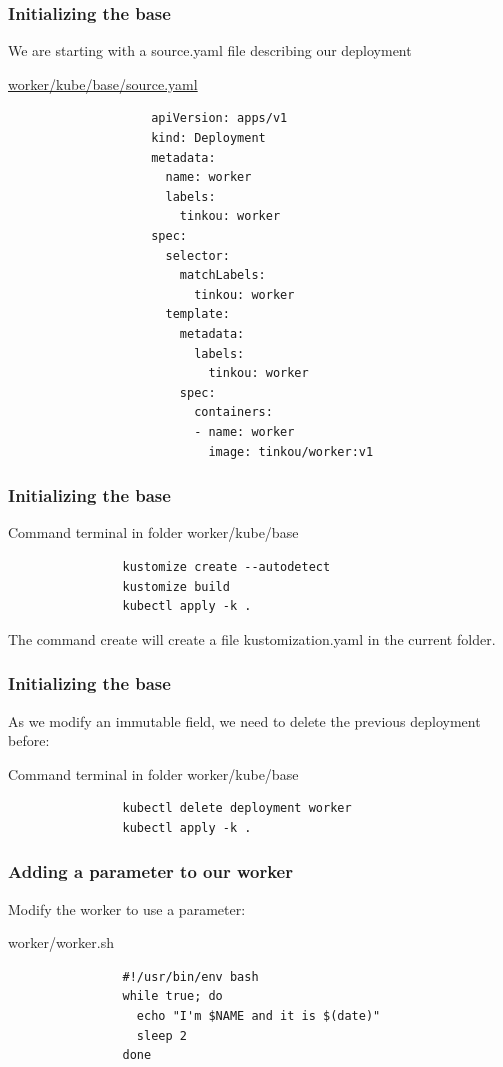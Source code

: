 	\begin{frame}[fragile]
		\frametitle{Initializing the base}
		
		We are starting with a source.yaml file describing our deployment
		\begin{block}{\href{https://github.com/Tinkou/trainings/blob/master/trainings/sources/dev-onboarding/files/worker/source.yaml}{worker/kube/base/source.yaml}}
			\begin{tiny}
				\begin{verbatim}
					apiVersion: apps/v1
					kind: Deployment
					metadata:
					  name: worker
					  labels:
					    tinkou: worker
					spec:
					  selector:
					    matchLabels:
					      tinkou: worker
					  template:
					    metadata:
					      labels:
					        tinkou: worker
					    spec:
					      containers:
					      - name: worker
					        image: tinkou/worker:v1
				\end{verbatim}
			\end{tiny}
		\end{block}
	\end{frame}
	
	\begin{frame}[fragile]
		\frametitle{Initializing the base}
		\begin{block}{Command terminal in folder worker/kube/base}
			\begin{verbatim}
				kustomize create --autodetect
				kustomize build
				kubectl apply -k .
			\end{verbatim}
		\end{block}
		\medskip
		The command create will create a file kustomization.yaml in the current folder.
	\end{frame}
	
	\begin{frame}[fragile]
		\frametitle{Initializing the base}
		As we modify an immutable field, we need to delete the previous deployment before:
		\begin{block}{Command terminal in folder worker/kube/base}
			\begin{verbatim}
				kubectl delete deployment worker
				kubectl apply -k .
			\end{verbatim}
		\end{block}
	\end{frame}
	
	\begin{frame}[fragile]
		\frametitle{Adding a parameter to our worker}
		
		Modify the worker to use a parameter:
		\begin{block}{worker/worker.sh}
			\begin{verbatim}
				#!/usr/bin/env bash
				while true; do
				  echo "I'm $NAME and it is $(date)"
				  sleep 2
				done
			\end{verbatim}
		\end{block}
	\end{frame}
	
